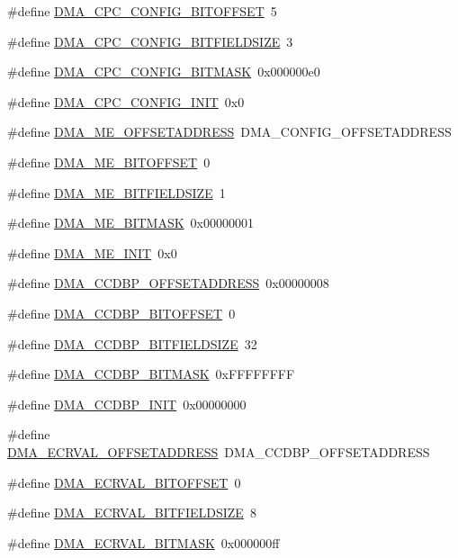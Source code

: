 \begin{DoxyCompactItemize}
\#define \hyperlink{a00547_ab242bf9b2f92d776f1019ef9ffcb8a4c}{DMA\_\-CPC\_\-CONFIG\_\-BITOFFSET}~5
\item 
\#define \hyperlink{a00547_a4f72a0c45e3181273b66098bcc479228}{DMA\_\-CPC\_\-CONFIG\_\-BITFIELDSIZE}~3
\item 
\#define \hyperlink{a00547_ac5e794e02a86f98fdb696b4d3e71aecd}{DMA\_\-CPC\_\-CONFIG\_\-BITMASK}~0x000000e0
\item 
\#define \hyperlink{a00547_afa9e72d773ecb33158a9a13a2408647a}{DMA\_\-CPC\_\-CONFIG\_\-INIT}~0x0
\item 
\#define \hyperlink{a00547_a7af40d196784d21fc22c5e8f1c9f471e}{DMA\_\-ME\_\-OFFSETADDRESS}~DMA\_\-CONFIG\_\-OFFSETADDRESS
\item 
\#define \hyperlink{a00547_af26e520e052c29bec34ee52bab49bb9b}{DMA\_\-ME\_\-BITOFFSET}~0
\item 
\#define \hyperlink{a00547_aff6beddf89e8b7af7377279431360c01}{DMA\_\-ME\_\-BITFIELDSIZE}~1
\item 
\#define \hyperlink{a00547_aafb9aa03d070970b79fd94037619f61a}{DMA\_\-ME\_\-BITMASK}~0x00000001
\item 
\#define \hyperlink{a00547_aeaa1845f74e1ae1db7a24a7dcd2b7438}{DMA\_\-ME\_\-INIT}~0x0
\item 
\#define \hyperlink{a00547_a8f559ca9f5e7a90713050f67560878c2}{DMA\_\-CCDBP\_\-OFFSETADDRESS}~0x00000008
\item 
\#define \hyperlink{a00547_a6e09a969715ff30c8d11bc90818a6ba4}{DMA\_\-CCDBP\_\-BITOFFSET}~0
\item 
\#define \hyperlink{a00547_a989faedaed8ced3e17f0d877644eece3}{DMA\_\-CCDBP\_\-BITFIELDSIZE}~32
\item 
\#define \hyperlink{a00547_a275a38cf1823e3a27c3e0e91725466d4}{DMA\_\-CCDBP\_\-BITMASK}~0xFFFFFFFF
\item 
\#define \hyperlink{a00547_af9d68df9474a8192e40826367158ed19}{DMA\_\-CCDBP\_\-INIT}~0x00000000
\item 
\#define \hyperlink{a00547_a1ba53edcece39b3c172d2b073a747e09}{DMA\_\-ECRVAL\_\-OFFSETADDRESS}~DMA\_\-CCDBP\_\-OFFSETADDRESS
\item 
\#define \hyperlink{a00547_a16c269acf3f99d66899dd002b91f80d5}{DMA\_\-ECRVAL\_\-BITOFFSET}~0
\item 
\#define \hyperlink{a00547_a402e7b3a5891401d10193789541a34cb}{DMA\_\-ECRVAL\_\-BITFIELDSIZE}~8
\item 
\#define \hyperlink{a00547_a4d2ec1d32bbd0155bd23334b293f82ad}{DMA\_\-ECRVAL\_\-BITMASK}~0x000000ff
\item 

\end{DoxyCompactItemize}
